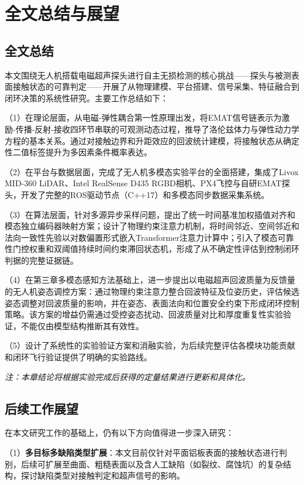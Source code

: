 \chapter{全文总结与展望}

\section{全文总结}

本文围绕无人机搭载电磁超声探头进行自主无损检测的核心挑战——探头与被测表面接触状态的可靠判定——开展了从物理建模、平台搭建、信号采集、特征融合到闭环决策的系统性研究。主要工作总结如下：

（1）在理论层面，从电磁-弹性耦合第一性原理出发，将EMAT信号链表示为激励-传播-反射-接收四环节串联的可观测动态过程，推导了洛伦兹体力与弹性动力学方程的基本关系。通过对接触边界和升距效应的回波统计建模，将接触状态从确定性二值标签提升为多因素条件概率表达。

（2）在平台与数据层面，完成了无人机多模态实验平台的全面搭建，集成了Livox MID-360 LiDAR、Intel RealSense D435 RGBD相机、PX4飞控与自研EMAT探头，开发了完整的ROS驱动节点（C++17）和多模态同步数据采集系统。

（3）在算法层面，针对多源异步采样问题，提出了统一时间基准加权插值对齐和模态独立编码器映射方案；设计了物理约束注意力机制，将时间邻近、空间邻近和法向一致性先验以对数偏置形式嵌入Transformer注意力计算中；引入了模态可靠性门控权重和双阈值持续时间约束滞回状态机，形成了从不确定性评估到控制闭环判据的完整证据链。

（4）在第三章多模态感知方法基础上，进一步提出以电磁超声回波质量为反馈量的无人机姿态调控方案：通过物理约束注意力整合回波特征及位姿历史，评估候选姿态调整对回波质量的影响，并在姿态、表面法向和位置安全约束下形成闭环控制策略。该方案的增益仍需通过受控姿态扰动、回波质量对比和厚度重复性实验验证，不能仅由模型结构推断其有效性。

（5）设计了系统性的实验验证方案和消融实验，为后续完整评估各模块功能贡献和闭环飞行验证提供了明确的实验路线。

\textit{注：本章结论将根据实验完成后获得的定量结果进行更新和具体化。}

\section{后续工作展望}

在本文研究工作的基础上，仍有以下方向值得进一步深入研究：

（1）\textbf{多目标多缺陷类型扩展}：本文目前仅针对平面铝板表面的接触状态进行判别，后续可扩展至曲面、粗糙表面以及含人工缺陷（如裂纹、腐蚀坑）的复杂结构，探讨缺陷类型对接触判定和超声信号的影响。

